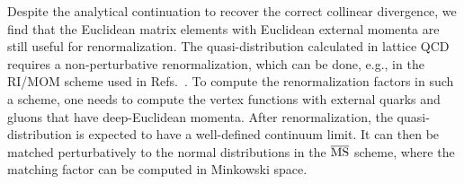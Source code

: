 Despite the analytical continuation to recover the correct collinear divergence, we find that the Euclidean matrix elements with Euclidean external momenta are still useful for renormalization. The quasi-distribution calculated in lattice QCD requires a non-perturbative renormalization, which can be done, e.g., in the RI/MOM scheme used in Refs.~\cite{Alexandrou:2017huk,Chen:2017mzz,Stewart:2017tvs}. To compute the renormalization factors in such a scheme, one needs to compute the vertex functions with external quarks and gluons that have deep-Euclidean momenta. After renormalization, the quasi-distribution is expected to have a well-defined continuum limit. It can then be matched perturbatively to the normal distributions in the $\overline{\rm MS}$ scheme, where the matching factor can be computed in Minkowski space.

